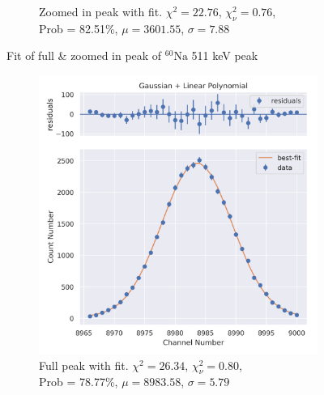 \documentclass[11pt,a4paper]{article}
\newcommand{\element}[2]{$^{#2}\textrm{#1}$}
\begin{document}
\begin{figure}[H]
\begin{subfigure}{.5\linewidth}
    \caption{Zoomed in peak with fit. $\chi^2 = 22.76$, $\chi^2_\nu = 0.76$, \\ Prob = 82.51\%, $\mu = 3601.55$, $\sigma = 7.88$}
  \end{subfigure}
  \caption{Fit of full \& zoomed in peak of \element{Na}{60} 511 keV peak}
\end{figure}
\begin{figure}[H]
  \centering
  \begin{subfigure}{.5\linewidth}
    \centering
    \includegraphics[width=\linewidth]{./Images/Sodium22/Linear/Linear_2_Full.png}
    \caption{Full peak with fit. $\chi^2 = 26.34$, $\chi^2_\nu = 0.80$, \\ Prob = 78.77\%, $\mu = 8983.58$, $\sigma = 5.79$}
  \end{subfigure}%
  \begin{subfigure}{.5\linewidth}
    \centering

\end{subfigure}
\end{figure}
\end{document}
